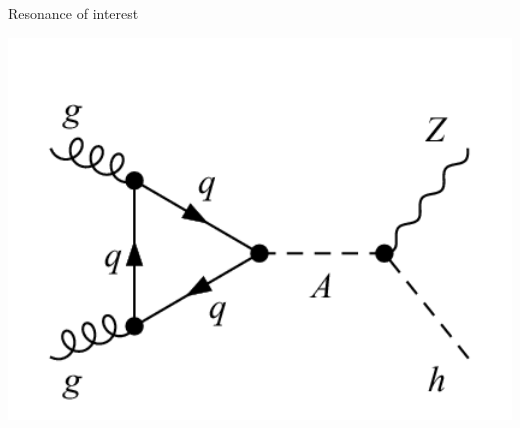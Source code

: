 \documentclass[10pt]{beamer} %
\begin{document}
\begin{frame}{Resonance of interest}
    \begin{minipage}[b]{0.32\linewidth}
        \centering
{}
    \end{minipage}
        \hfill
    \begin{minipage}[b]{0.32\linewidth}
        \centering
        \includegraphics[width=1.0\textwidth]{Figs/AtoZH.png}
    \end{minipage}
        \hfill
    \begin{minipage}[b]{0.32\linewidth}
        \centering

\end{minipage}
\end{frame}
\end{document}
